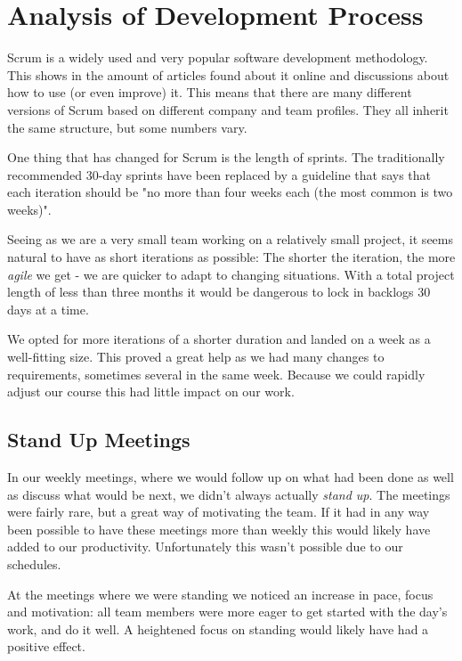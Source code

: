 \section{Analysis of Development Process}

Scrum is a widely used and very popular software development methodology. This shows in the amount
of articles found about it online and discussions about how to use (or even improve) it. This means
that there are many different versions of Scrum based on different company and team profiles. They
all inherit the same structure, but some numbers vary.

One thing that has changed for Scrum is the length of sprints. The traditionally recommended 30-day
sprints have been replaced by a guideline that says that each iteration should be "no more than four
weeks each (the most common is two weeks)"\cite{scrumprime}.

Seeing as we are a very small team working on a relatively small project, it seems natural to have as 
short iterations as possible: The shorter the iteration, the more \emph{agile} we get - we are quicker
to adapt to changing situations. With a total project length of less than three months it would be
dangerous to lock in backlogs 30 days at a time.

We opted for more iterations of a shorter duration and landed on a week as a well-fitting size. This
proved a great help as we had many changes to requirements, sometimes several in the same week. Because
we could rapidly adjust our course this had little impact on our work.

\subsection{Stand Up Meetings}

In our weekly meetings, where we would follow up on what had been done as well as discuss what would be
next, we didn't always actually \emph{stand up}. The meetings were fairly rare, but a great way of
motivating the team. If it had in any way been possible to have these meetings more than weekly this would
likely have added to our productivity. Unfortunately this wasn't possible due to our schedules.

At the meetings where we were standing we noticed an increase in pace, focus and motivation: all team members
were more eager to get started with the day's work, and do it well. A heightened focus on standing would
likely have had a positive effect.

